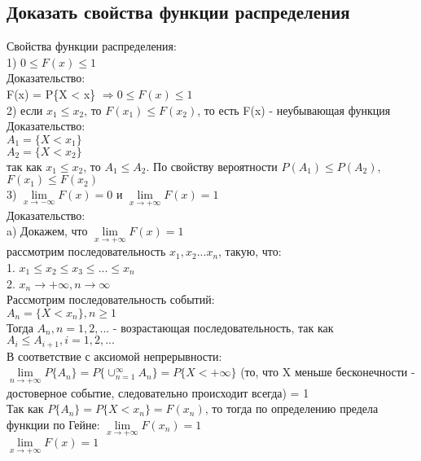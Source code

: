 \subsection{Доказать свойства функции распределения}
Свойства функции распределения:\\
1) $0 \leqslant F(x) \leqslant 1$\\
Доказательство:\\
F(x) = P\{X < x\} $\Rightarrow 0 \leqslant F(x) \leqslant 1$\\
2) если $x_{1} \leqslant x_{2}$, то $F(x_{1}) \leqslant F(x_{2})$, то есть F(x) - неубывающая функция\\ 
Доказательство:\\
$A_{1} = \{ X < x_{1}\}$\\
$A_{2} = \{ X < x_{2}\}$\\
так как $x_{1} \leqslant x_{2}$, то $A_{1} \leqslant A_{2}$. По свойству вероятности $P(A_{1}) \leqslant P(A_{2})$, $F(x_{1}) \leqslant F(x_{2})$\\
3) $\lim\limits_{x \rightarrow -\infty} F(x) = 0$ и $\lim\limits_{x \rightarrow +\infty} F(x) = 1$\\
Доказательство:\\
a) Докажем, что $\lim\limits_{x \rightarrow +\infty} F(x) = 1$\\
рассмотрим последовательность $x_{1}, x_{2} ... x_{n}$, такую, что:\\
1. $x_{1} \leqslant x_{2} \leqslant x_{3} \leqslant ... \leqslant x_{n}$\\
2. $x_{n} 	\rightarrow +\infty, n \rightarrow \infty$\\
Рассмотрим последовательность событий:\\
$A_{n} = \{X < x_{n}\}, n \geqslant 1$\\
Тогда $A_{n}, n = 1, 2, ...$ - возрастающая последовательность, так как $A_{i} \leqslant A_{i+1}, i = 1, 2, ...$\\
В соответствие с аксиомой непрерывности:\\
$\lim\limits_{n \rightarrow +\infty} P\{A_{n}\} = P \{ \cup^{\infty}_{n = 1} A_{n} \} = P \{ X < +\infty \}$ (то, что X меньше бесконечности - достоверное событие, следовательно происходит всегда) = 1\\
Так как $P\{A_{n}\} = P \{ X < x_{n} \} = F(x_{n})$, то тогда по определению предела функции по Гейне: $\lim\limits_{x \rightarrow +\infty} F(x_{n}) = 1$\\
$\lim\limits_{x \rightarrow +\infty} F(x) = 1$\\
